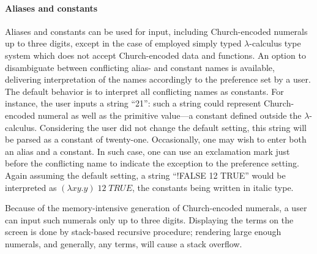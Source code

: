 \documentclass[table, a4paper, 10pt]{article}
\begin{document}
\paragraph{Aliases and constants}
Aliases and constants can be used for input, including Church-encoded numerals up to three digits,
except in the case of employed simply typed $\lambda$-calculus type system which does not
accept Church-encoded data and functions.
An option to disambiguate between conflicting alias- and constant names is available,
delivering interpretation of the names accordingly to the preference set by a user. The default behavior is
to interpret all conflicting names as constants. For instance, the user inputs
a string ``21'': such a string could represent Church-encoded numeral as well as the primitive
value---a constant defined outside the $\lambda$-calculus. Considering the user did not change the default
setting, this string will be parsed as a constant of twenty-one. Occasionally, one may wish
to enter both an alias and a constant. In such case, one can use an exclamation mark
just before the conflicting name to indicate the exception to the preference setting.
Again assuming the default setting, a string ``!FALSE 12 TRUE'' would be interpreted as
$(\lambda xy.y)\;\textit{12}\;\textit{TRUE}$, the constants being written in italic type.

Because of the memory-intensive generation of Church-encoded numerals, a user can input
such numerals only up to three digits. Displaying the terms on the screen is done
by stack-based recursive procedure; rendering large enough numerals, and generally, any terms,
will cause a stack overflow.
\end{document}
